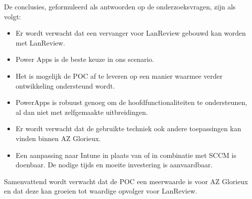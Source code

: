 De conclusies, geformuleerd als antwoorden op de onderzoeksvragen, zijn als volgt:
\begin{itemize}
    \item Er wordt verwacht dat een vervanger voor LanReview gebouwd kan worden met LanReview.
    \item Power Apps is de beste keuze in ons scenario.
    \item Het is mogelijk de POC af te leveren op een manier waarmee verder ontwikkeling ondersteund wordt.
    \item PowerApps is robuust genoeg om de hoofdfunctionaliteiten te ondersteunen, al dan niet met zelfgemaakte uitbreidingen.
    \item Er wordt verwacht dat de gebruikte techniek ook andere toepassingen kan vinden binnen AZ Glorieux.
    \item Een aanpassing naar Intune in plaats van of in combinatie met SCCM is doenbaar. De nodige tijds en moeite investering is aanvaardbaar.
\end{itemize}

\vspace{5mm}

Samenvattend wordt verwacht dat de POC een meerwaarde is voor AZ Glorieux en dat deze kan groeien tot waardige opvolger voor LanReview. 


